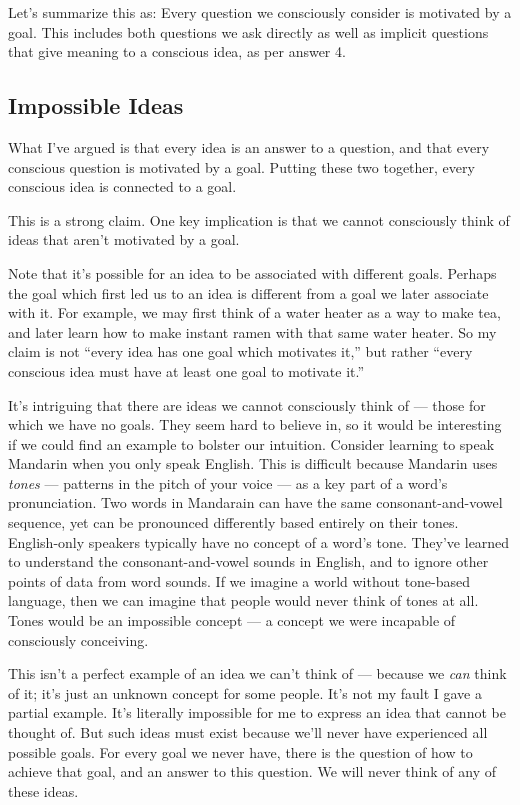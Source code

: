 \documentclass[11pt, oneside]{article}   	%
\newenvironment{answer}[1]
  {\renewcommand\theinnercustomthm{#1}\innercustomthm}
  {\endinnercustomthm}
\begin{document}
\pagebreak

Let's summarize this as:
\begin{answer}{5}
    Every question we consciously consider is motivated by a goal.
\end{answer}
This includes both questions we ask directly as well as
implicit questions that give meaning to a conscious idea, as per
answer 4.

\subsection{Impossible Ideas}

What I've argued is that every idea is an answer to a question, and that every
conscious question is motivated by a goal. Putting these two together,
every
conscious idea is connected to a goal.

This is a strong claim. One key implication is that we cannot consciously
think of ideas that aren't motivated by a goal.

Note that it's possible for an idea to be associated with different goals.
Perhaps the goal which first led us to an idea is
different from a goal we later associate with it. For example, we may first
think of a water heater as a way to make tea, and later learn how to make
instant ramen with that same water heater.
So my claim is not ``every idea has one goal which motivates it,'' but rather
``every conscious idea must have at least one goal to motivate it.''

It's intriguing that there are ideas we cannot consciously think of ---
those for
which we have no goals. They seem hard to believe in, so it would be
interesting if we could find an example to bolster our intuition.
Consider learning to speak Mandarin when you only speak English.
This is difficult because Mandarin uses {\em tones} --- patterns in the pitch of
your voice --- as a key part of a word's pronunciation.
Two words in Mandarain can have
the same consonant-and-vowel sequence, yet can be
pronounced differently based entirely on their tones.
English-only speakers typically have no concept of a word's tone.
They've learned to understand the consonant-and-vowel sounds in English, and to
ignore other points of data from word sounds. If we imagine a world without
tone-based language, then we can imagine that people would never think of
tones at all. Tones would be an impossible concept --- a concept we were
incapable of consciously conceiving.

This isn't a perfect example of an idea we can't think of --- because we {\em
can} think of it; it's just an unknown concept for some people.
It's not my fault I
gave a partial example.
It's literally impossible for me to express an idea that
cannot be thought of.
But such ideas must exist because we'll never
have experienced all possible goals.
For every goal we never have,
there is the question of how to achieve that goal, and an answer to this
question. We will never think of any of these ideas.
\end{document}
